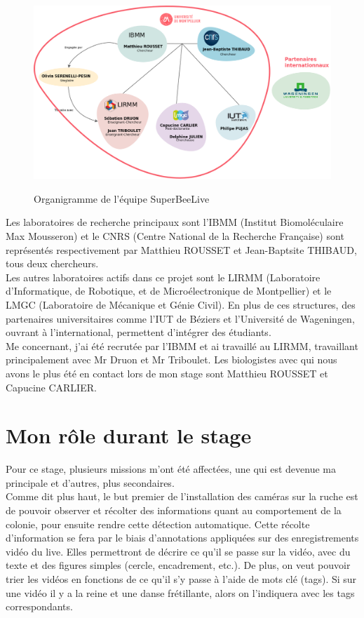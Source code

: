 \documentclass[11pt,french,a4paper]{report}
\begin{document}
\begin{figure}[!h]
\centering
\includegraphics[scale=0.3]{../images/dia/organiramme_equipe_projet.png} \\
\caption{Organigramme de l'équipe SuperBeeLive}
\label{orga_sbl}
\end{figure}

Les laboratoires de recherche principaux sont l'IBMM (Institut Biomoléculaire Max Mousseron) 
et le CNRS (Centre National de la Recherche Française) sont représentés respectivement par Matthieu ROUSSET et Jean-Baptsite THIBAUD, 
tous deux chercheurs. \\
Les autres laboratoires actifs dans ce projet sont le LIRMM (Laboratoire d'Informatique, de Robotique, 
et de Microélectronique de Montpellier) et le LMGC (Laboratoire de Mécanique et Génie Civil). En plus de ces structures, 
des partenaires universitaires comme l'IUT de Béziers et l'Université de Wageningen, ouvrant à l'international,
permettent d'intégrer des étudiants. \\
Me concernant, j'ai été recrutée par l'IBMM et ai travaillé au LIRMM, travaillant principalement avec Mr Druon et 
Mr Triboulet. Les biologistes avec qui nous avons le plus été en contact lors de mon stage sont Matthieu ROUSSET et Capucine CARLIER. \\


\section{Mon rôle durant le stage}
Pour ce stage, plusieurs missions m'ont été affectées, une qui est devenue ma principale et d'autres, plus secondaires.\\

Comme dit plus haut, le but premier de l'installation des caméras sur la ruche est de pouvoir observer et récolter des informations
quant au comportement de la colonie, pour ensuite rendre cette détection automatique. Cette récolte d'information se fera par le 
biais d'annotations appliquées sur des enregistrements vidéo du live. Elles permettront de décrire ce qu'il se passe sur la vidéo, 
avec du texte et des figures simples (cercle, encadrement, etc.).
De plus, on veut pouvoir trier les vidéos en fonctions de ce qu'il s'y passe à l'aide de mots clé (tags). 
Si sur une vidéo il y a la reine et une danse frétillante, alors on l'indiquera avec les tags correspondants. \\
\end{document}
